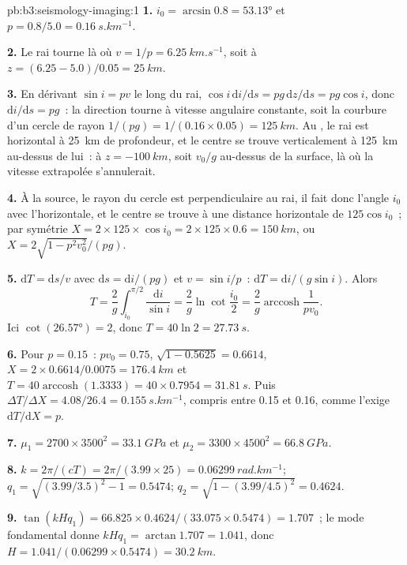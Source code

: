 \begin{solution}{pb:b3:seismology-imaging:1}
\textbf{1.} $i_0 = \arcsin 0.8 = \ang{53.13}$ et $p = 0.8/5.0 =
\qty{0.16}{s.km^{-1}}$.

\textbf{2.} Le rai tourne là où $v = 1/p = \qty{6.25}{km.s^{-1}}$, soit à
$z = (6.25 - 5.0)/0.05 = \qty{25}{km}$.

\textbf{3.} En dérivant $\sin i = pv$ le long du rai, $\cos i\,\mathrm di/
\mathrm ds = pg\,\mathrm dz/\mathrm ds = pg\cos i$, donc $\mathrm di/\mathrm ds =
pg$~: la direction tourne à vitesse angulaire constante, soit la courbure d'un cercle de rayon
$1/(pg) = 1/(0.16\times0.05) = \qty{125}{km}$. Au , le rai est
horizontal à \qty{25}{km} de profondeur, et le centre se trouve verticalement à \qty{125}{km}
au-dessus de lui~: à $z = \qty{-100}{km}$, soit $v_0/g$ au-dessus de la surface, là où la
vitesse extrapolée s'annulerait.

\textbf{4.} À la source, le rayon du cercle est perpendiculaire au rai,
il fait donc l'angle $i_0$ avec l'horizontale, et le centre se trouve
à une distance horizontale de $125\cos i_0$~; par symétrie
$X = 2\times125\times\cos i_0 = 2\times125\times0.6 = \qty{150}{km}$, ou
$X = 2\sqrt{1 - p^2v_0^2}/(pg)$.

\textbf{5.} $\mathrm dT = \mathrm ds/v$ avec $\mathrm ds = \mathrm di/(pg)$ et
$v = \sin i/p$~: $\mathrm dT = \mathrm di/(g\sin i)$. Alors
\[
  T = \frac2g\int_{i_0}^{\pi/2}\frac{\mathrm di}{\sin i} = \frac2g\ln\cot\frac{i_0}2 =
  \frac2g\operatorname{arccosh}\frac1{pv_0} .
\]
Ici $\cot(\ang{26.57}) = 2$, donc
$T = 40\ln2 = \qty{27.73}{s}$.

\textbf{6.} Pour $p = 0.15$~: $pv_0 = 0.75$, $\sqrt{1 - 0.5625} = 0.6614$,
$X = 2\times0.6614/0.0075 = \qty{176.4}{km}$ et $T = 40\operatorname{arccosh}
(1.3333) = 40\times0.7954 = \qty{31.81}{s}$. Puis $\Delta T/\Delta X =
4.08/26.4 = \qty{0.155}{s.km^{-1}}$, compris entre 0.15 et 0.16, comme
l'exige $\mathrm dT/\mathrm dX = p$.

\textbf{7.} $\mu_1 = 2700\times3500^2 = \qty{33.1}{GPa}$ et
$\mu_2 = 3300\times4500^2 = \qty{66.8}{GPa}$.

\textbf{8.} $k = 2\pi/(cT) = 2\pi/(3.99\times25) = \qty{0.06299}{rad.km^{-1}}$;
$q_1 = \sqrt{(3.99/3.5)^2 - 1} = 0.5474$; $q_2 = \sqrt{1 - (3.99/4.5)^2} = 0.4624$.

\textbf{9.} $\tan(kHq_1) = 66.825\times0.4624/(33.075\times0.5474) = 1.707$~; le
mode fondamental donne $kHq_1 = \arctan1.707 = 1.041$, donc
$H = 1.041/(0.06299\times0.5474) = \qty{30.2}{km}$.


\end{solution}
